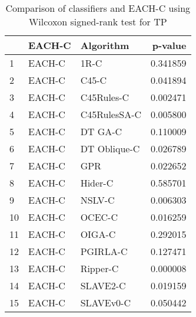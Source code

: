 \begin{table}
\footnotesize
\caption{Comparison of classifiers and EACH-C using Wilcoxon signed-rank test for TP}
\label{tab:EACH-C wilcoxon TP comparison}
\begin{tabular}{lllr}
\hline
 & EACH-C & Algorithm & p-value \\
\hline
1 & EACH-C & 1R-C & 0.341859 \\
2 & EACH-C & C45-C & 0.041894 \\
3 & EACH-C & C45Rules-C & 0.002471 \\
4 & EACH-C & C45RulesSA-C & 0.005800 \\
5 & EACH-C & DT GA-C & 0.110009 \\
6 & EACH-C & DT Oblique-C & 0.026789 \\
7 & EACH-C & GPR & 0.022652 \\
8 & EACH-C & Hider-C & 0.585701 \\
9 & EACH-C & NSLV-C & 0.006303 \\
10 & EACH-C & OCEC-C & 0.016259 \\
11 & EACH-C & OIGA-C & 0.292015 \\
12 & EACH-C & PGIRLA-C & 0.127471 \\
13 & EACH-C & Ripper-C & 0.000008 \\
14 & EACH-C & SLAVE2-C & 0.019159 \\
15 & EACH-C & SLAVEv0-C & 0.050442 \\
\hline
\end{tabular}
\end{table}
